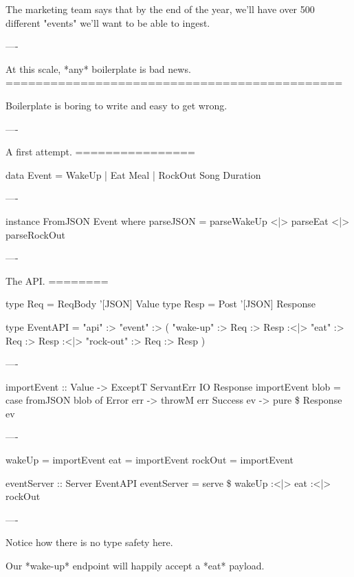The marketing team says that by the end of the year, we'll have over 500 different "events" we'll want to be able to
ingest.

----

At this scale, *any* boilerplate is bad news.
=============================================

Boilerplate is boring to write and easy to get wrong.

----

A first attempt.
================

\begin{hs}
  data Event = WakeUp
             | Eat     Meal
             | RockOut Song Duration
\end{hs}

----

\begin{hs}
  instance FromJSON Event where
    parseJSON = parseWakeUp
            <|> parseEat
            <|> parseRockOut
\end{hs}

----

The API.
========

\begin{hs}
  type Req  = ReqBody '[JSON] Value
  type Resp = Post    '[JSON] Response

  type EventAPI =
    "api" :> "event" :>
               ( "wake-up"  :> Req :> Resp
            :<|> "eat"      :> Req :> Resp
            :<|> "rock-out" :> Req :> Resp
               )
\end{hs}

----

\begin{hs}
  importEvent :: Value -> ExceptT ServantErr IO Response
  importEvent blob =
    case fromJSON blob of
      Error   err -> throwM err
      Success ev  -> pure \$ Response ev
\end{hs}

----

\begin{hs}
  wakeUp  = importEvent
  eat     = importEvent
  rockOut = importEvent

  eventServer :: Server EventAPI
  eventServer = serve \$
    wakeUp :<|> eat :<|> rockOut
\end{hs}

----

Notice how there is no type safety here.

Our *wake-up* endpoint will happily accept a *eat* payload.

